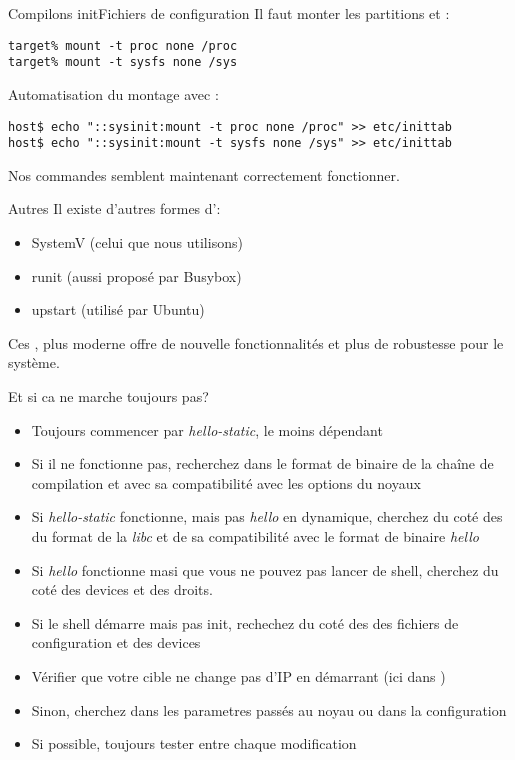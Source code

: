 \begin{frame}[fragile=singleslide]{Compilons init}{Fichiers de configuration}
  Il faut monter les partitions  et :
  \begin{lstlisting}
target% mount -t proc none /proc 
target% mount -t sysfs none /sys
  \end{lstlisting}
  Automatisation du montage avec :
  \begin{lstlisting}
host$ echo "::sysinit:mount -t proc none /proc" >> etc/inittab 
host$ echo "::sysinit:mount -t sysfs none /sys" >> etc/inittab 
  \end{lstlisting}
  Nos commandes semblent maintenant correctement fonctionner.
\end{frame}

\begin{frame}[fragile=singleslide]{Autres }
  Il existe d'autres formes d':
  \begin{itemize}
  \item SystemV (celui que nous utilisons)
  \item runit (aussi proposé par Busybox)
  \item upstart (utilisé par Ubuntu)
  \end{itemize}
  Ces ,  plus moderne  offre de nouvelle  fonctionnalités et
  plus de robustesse pour le système.
\end{frame}

\begin{frame}{Et si ca ne marche toujours pas?}
  \begin{itemize}
  \item Toujours commencer par  \emph{hello-static}, le moins dépendant
  \item Si il ne fonctionne  pas, recherchez dans le format de binaire
    de  la chaîne  de compilation  et avec  sa compatibilité  avec les
    options du noyaux
  \item  Si \emph{hello-static} fonctionne,  mais pas  \emph{hello} en
    dynamique, cherchez du coté des  du format de la \emph{libc} et de
    sa compatibilité avec le format de binaire \emph{hello}
  \item Si \emph{hello} fonctionne masi  que vous ne pouvez pas lancer
    de shell, cherchez du coté des devices et des droits.
  \item Si le  shell démarre mais pas init, rechechez  du coté des des
    fichiers de configuration et des devices
  \item Vérifier que votre cible  ne change pas d'IP en démarrant (ici
    dans )
  \item Sinon, cherchez dans les parametres passés au noyau ou dans la
    configuration
  \item Si possible, toujours tester entre chaque modification
  \end{itemize}
\end{frame}

